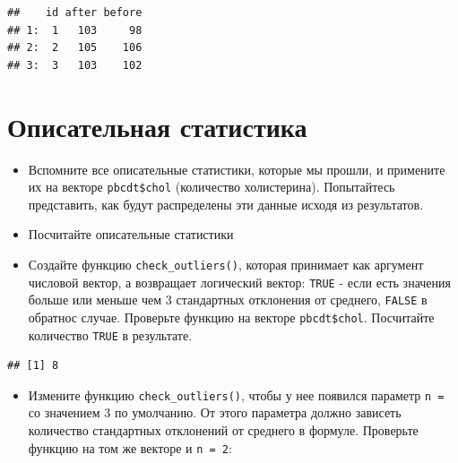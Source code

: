 \documentclass[]{book}
\newenvironment{Shaded}{\begin{snugshade}}{\end{snugshade}}
\newcommand{\KeywordTok}[1]{\textcolor[rgb]{0.13,0.29,0.53}{\textbf{#1}}}
\newcommand{\DecValTok}[1]{\textcolor[rgb]{0.00,0.00,0.81}{#1}}
\newcommand{\StringTok}[1]{\textcolor[rgb]{0.31,0.60,0.02}{#1}}
\newcommand{\ControlFlowTok}[1]{\textcolor[rgb]{0.13,0.29,0.53}{\textbf{#1}}}
\newcommand{\OperatorTok}[1]{\textcolor[rgb]{0.81,0.36,0.00}{\textbf{#1}}}
\newcommand{\NormalTok}[1]{#1}
\providecommand{\tightlist}{%
  \setlength{\itemsep}{0pt}\setlength{\parskip}{0pt}}
\begin{document}
\begin{verbatim}
##    id after before
## 1:  1   103     98
## 2:  2   105    106
## 3:  3   103    102
\end{verbatim}

\section{Описательная статистика}\label{solvtask_desc}

\begin{itemize}
\item
  Вспомните все описательные статистики, которые мы прошли, и примените
  их на векторе \texttt{pbcdt\$chol} (количество холистерина).
  Попытайтесь представить, как будут распределены эти данные исходя из
  результатов.
\item
  Посчитайте описательные статистики
\item
  Создайте функцию \texttt{check\_outliers()}, которая принимает как
  аргумент числовой вектор, а возвращает логический вектор:
  \texttt{TRUE} - если есть значения больше или меньше чем 3 стандартных
  отклонения от среднего, \texttt{FALSE} в обратнос случае. Проверьте
  функцию на векторе \texttt{pbcdt\$chol}. Посчитайте количество
  \texttt{TRUE} в результате.
\end{itemize}

\begin{Shaded}
\end{Shaded}

\begin{verbatim}
## [1] 8
\end{verbatim}

\begin{itemize}
\tightlist
\item
  Измените функцию \texttt{check\_outliers()}, чтобы у нее появился
  параметр \texttt{n\ =} со значением 3 по умолчанию. От этого параметра
  должно зависеть количество стандартных отклонений от среднего в
  формуле. Проверьте функцию на том же векторе и \texttt{n\ =\ 2}:
\end{itemize}
\end{document}
